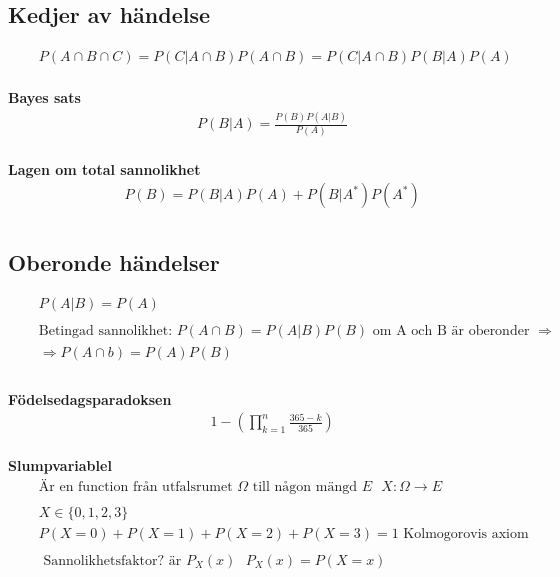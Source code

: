 \subsection{Kedjer av händelse}
\begin{align*}
  &\quad  P(A\cap{B}\cap{C}) = P(C|A\cap{B})P(A\cap{B}) = P(C|A\cap{B})P(B|A)P(A)  \\
\end{align*}

\textbf{Bayes sats}
\begin{align*}
  &\quad  P(B|A) = \frac{P(B)P(A|B)}{P(A)}  \\
\end{align*}

\textbf{Lagen om total sannolikhet}
\begin{align*}
  &\quad  P(B) = P(B|A)P(A) + P(B|A^*)P(A^*) \\
\end{align*}

\subsection{Oberonde händelser}
\begin{align*}
  &\quad  P(A|B)=P(A) \\
  &\quad   \\
  &\quad  \text{Betingad sannolikhet: } P(A\cap{B})=P(A|B)P(B) \text{ om A och B är oberonder } \Rightarrow \\
  &\quad  \Rightarrow P(A\cap{b}) = P(A)P(B) \\
  &\quad   \\
\end{align*}

\textbf{Födelsedagsparadoksen}
\begin{align*}
  &\quad  1-(\prod_{k = 1}^{n} \frac{365-k}{365}) \\
\end{align*}

\textbf{Slumpvariablel}
\begin{align*}
  &\quad  \text{Är en function från utfalsrumet $\Omega$ till någon mängd $E$ } X:\Omega\to{E} \\
  &\quad   \\ %
  &\quad  X\in\{0,1,2,3\} \\
  &\quad  P(X=0)+P(X=1)+P(X=2)+P(X=3)=1 \text{ Kolmogorovis axiom } \\
  &\quad   \\
  &\quad  \text{ Sannolikhetsfaktor? är $P_X(x)$ } P_X(x)=P(X=x) \\
\end{align*}

